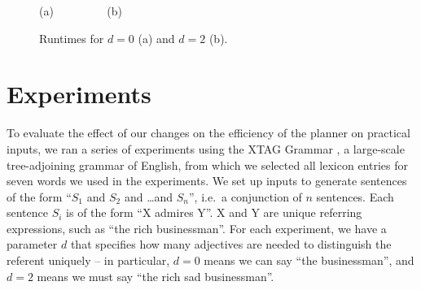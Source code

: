 
\begin{figure}[t]
  \centering
(a)
$\qquad\qquad$
(b)
\vspace{-0.5cm}
\caption{Runtimes for $d=0$ (a) and $d=2$ (b).}
  \label{fig:runtimes}
\vspace{-0.5cm}
\end{figure}


\section{Experiments} 
\label{sec:experiments}

To evaluate the effect of our changes on the efficiency of the planner
on practical inputs, we ran a series of experiments using the XTAG
Grammar \cite{xtag01:_tr}, a large-scale tree-adjoining grammar of
English, from which we selected all lexicon entries for seven words we
used in the experiments. We set up inputs to generate sentences of the
form ``$S_1$ and $S_2$ and \ldots and $S_n$'', i.e.\ a conjunction of
$n$ sentences. Each sentence $S_i$ is of the form ``X admires Y''. X
and Y are unique referring expressions, such as ``the rich
businessman''. For each experiment, we have a parameter $d$ that
specifies how many adjectives are needed to distinguish the referent
uniquely -- in particular, $d=0$ means we can say ``the businessman'',
and $d=2$ means we must say ``the rich sad businessman''.
%

